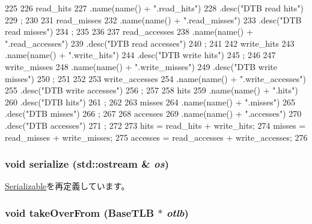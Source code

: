 \begin{DoxyCode}
225 {
226     read_hits
227         .name(name() + ".read_hits")
228         .desc("DTB read hits")
229         ;
230 
231     read_misses
232         .name(name() + ".read_misses")
233         .desc("DTB read misses")
234         ;
235 
236 
237     read_accesses
238         .name(name() + ".read_accesses")
239         .desc("DTB read accesses")
240         ;
241 
242     write_hits
243         .name(name() + ".write_hits")
244         .desc("DTB write hits")
245         ;
246 
247     write_misses
248         .name(name() + ".write_misses")
249         .desc("DTB write misses")
250         ;
251 
252 
253     write_accesses
254         .name(name() + ".write_accesses")
255         .desc("DTB write accesses")
256         ;
257 
258     hits
259         .name(name() + ".hits")
260         .desc("DTB hits")
261         ;
262 
263     misses
264         .name(name() + ".misses")
265         .desc("DTB misses")
266         ;
267 
268     accesses
269         .name(name() + ".accesses")
270         .desc("DTB accesses")
271         ;
272 
273     hits = read_hits + write_hits;
274     misses = read_misses + write_misses;
275     accesses = read_accesses + write_accesses;
276 }
\end{DoxyCode}
\hypertarget{classPowerISA_1_1TLB_a53e036786d17361be4c7320d39c99b84}{
\subsubsection[{serialize}]{\setlength{\rightskip}{0pt plus 5cm}void serialize (std::ostream \& {\em os})}}
\label{classPowerISA_1_1TLB_a53e036786d17361be4c7320d39c99b84}


\hyperlink{classSerializable_ad6272f80ae37e8331e3969b3f072a801}{Serializable}を再定義しています。\hypertarget{classPowerISA_1_1TLB_a15b6c15c1be2ca4de3e65772a02aa29f}{
\subsubsection[{takeOverFrom}]{\setlength{\rightskip}{0pt plus 5cm}void takeOverFrom ({\bf BaseTLB} $\ast$ {\em otlb})}}
\label{classPowerISA_1_1TLB_a15b6c15c1be2ca4de3e65772a02aa29f}



